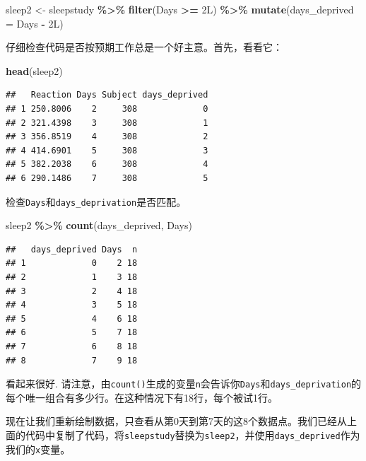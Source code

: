 \documentclass[
]{book}
\newenvironment{Shaded}{\begin{snugshade}}{\end{snugshade}}
\newcommand{\AttributeTok}[1]{\textcolor[rgb]{0.13,0.29,0.53}{#1}}
\newcommand{\FunctionTok}[1]{\textcolor[rgb]{0.13,0.29,0.53}{\textbf{#1}}}
\newcommand{\NormalTok}[1]{#1}
\newcommand{\OtherTok}[1]{\textcolor[rgb]{0.56,0.35,0.01}{#1}}
\newcommand{\SpecialCharTok}[1]{\textcolor[rgb]{0.81,0.36,0.00}{\textbf{#1}}}
\begin{document}
\begin{Shaded}
\begin{Highlighting}[]
\NormalTok{sleep2 }\OtherTok{\textless{}{-}}\NormalTok{ sleepstudy }\SpecialCharTok{\%\textgreater{}\%}
  \FunctionTok{filter}\NormalTok{(Days }\SpecialCharTok{\textgreater{}=}\NormalTok{ 2L) }\SpecialCharTok{\%\textgreater{}\%}
  \FunctionTok{mutate}\NormalTok{(}\AttributeTok{days\_deprived =}\NormalTok{ Days }\SpecialCharTok{{-}}\NormalTok{ 2L)}
\end{Highlighting}
\end{Shaded}

仔细检查代码是否按预期工作总是一个好主意。首先，看看它：

\begin{Shaded}
\begin{Highlighting}[]
\FunctionTok{head}\NormalTok{(sleep2)}
\end{Highlighting}
\end{Shaded}

\begin{verbatim}
##   Reaction Days Subject days_deprived
## 1 250.8006    2     308             0
## 2 321.4398    3     308             1
## 3 356.8519    4     308             2
## 4 414.6901    5     308             3
## 5 382.2038    6     308             4
## 6 290.1486    7     308             5
\end{verbatim}

检查\texttt{Days}和\texttt{days\_deprivation}是否匹配。

\begin{Shaded}
\begin{Highlighting}[]
\NormalTok{sleep2 }\SpecialCharTok{\%\textgreater{}\%}
  \FunctionTok{count}\NormalTok{(days\_deprived, Days)}
\end{Highlighting}
\end{Shaded}

\begin{verbatim}
##   days_deprived Days  n
## 1             0    2 18
## 2             1    3 18
## 3             2    4 18
## 4             3    5 18
## 5             4    6 18
## 6             5    7 18
## 7             6    8 18
## 8             7    9 18
\end{verbatim}

看起来很好. 请注意，由\texttt{count()}生成的变量\texttt{n}会告诉你\texttt{Days}和\texttt{days\_deprivation}的每个唯一组合有多少行。在这种情况下有18行，每个被试1行。

现在让我们重新绘制数据，只查看从第0天到第7天的这8个数据点。我们已经从上面的代码中复制了代码，将\texttt{sleepstudy}替换为\texttt{sleep2}，并使用\texttt{days\_deprived}作为我们的\texttt{x}变量。
\end{document}
